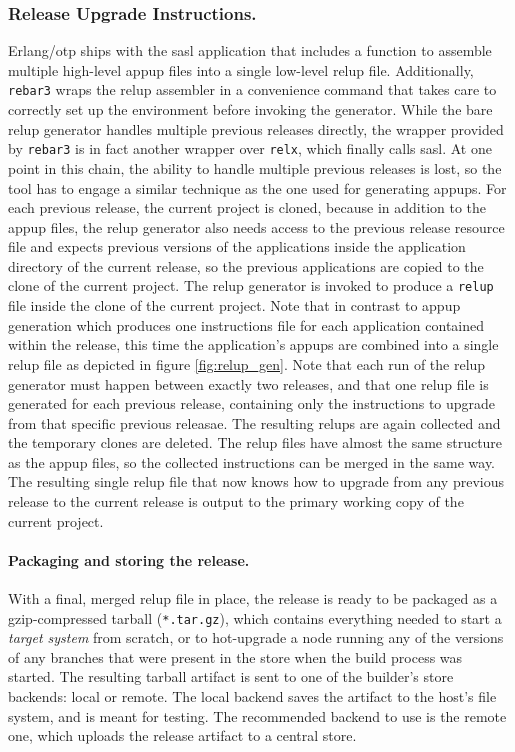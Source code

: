 {\subsubsection{Release Upgrade Instructions.} Erlang/\acrshort{otp} ships with the \acrfull{sasl} application that includes a function to assemble multiple high-level \acrfull{appup} files into a single low-level \acrfull{relup} file. Additionally, \lstinline|rebar3| wraps the \acrshort{relup} assembler in a convenience command that takes care to correctly set up the environment before invoking the generator. While the bare \acrshort{relup} generator handles multiple previous releases directly, the wrapper provided by \lstinline|rebar3| is in fact another wrapper over \lstinline|relx|, which finally calls \acrshort{sasl}. At one point in this chain, the ability to handle multiple previous releases is lost, so the tool has to engage a similar technique as the one used for generating \acrshort{appup}s. For each previous release, the current project is cloned, because in addition to the \acrshort{appup} files, the \acrshort{relup} generator also needs access to the previous release resource file and expects previous versions of the applications inside the application directory of the current release, so the previous applications are copied to the clone of the current project. The \acrshort{relup} generator is invoked to produce a \lstinline|relup| file inside the clone of the current project. Note that in contrast to \acrshort{appup} generation which produces one instructions file for each application contained within the release, this time the application's \acrshort{appup}s are combined into a single \acrshort{relup} file as depicted in figure \ref{fig:relup_gen}. Note that each run of the \acrshort{relup} generator must happen between exactly two releases, and that one \acrshort{relup} file is generated for each previous release, containing only the instructions to upgrade from that specific previous releasae. The resulting \acrshort{relup}s are again collected and the temporary clones are deleted. The \acrshort{relup} files have almost the same structure as the \acrshort{appup} files, so the collected instructions can be merged in the same way. The resulting single \acrshort{relup} file that now knows how to upgrade from any previous release to the current release is output to the primary working copy of the current project.

\paragraph{Packaging and storing the release.} With a final, merged \acrshort{relup} file in place, the release is ready to be packaged as a gzip-compressed tarball (\lstinline|*.tar.gz|), which contains everything needed to start a \emph{target system} from scratch, or to hot-upgrade a node running any of the versions of any branches that were present in the store when the build process was started. The resulting tarball artifact is sent to one of the builder's store backends: local or remote. The local backend saves the artifact to the host's file system, and is meant for testing. The recommended backend to use is the remote one, which uploads the release artifact to a central store.

}
